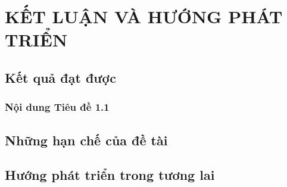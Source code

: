 \chapter{KẾT LUẬN VÀ HƯỚNG PHÁT TRIỂN}

\section{Kết quả đạt được}
\subsection{Nội dung Tiêu đề 1.1}

\section{Những hạn chế của đề tài}

\section{Hướng phát triển trong tương lai}
